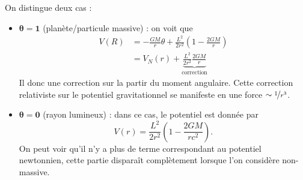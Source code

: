\documentclass[a4paper,11pt]{report}
\begin{document}
            On distingue deux cas :
            \begin{itemize}[label = \textbullet]
                \item $\bm{\theta = 1}$ (planète/particule massive) : on voit que 
                \begin{align}
                    V(R) &= -\frac{GM}{r}\theta+\frac{L^2}{2r^2}\left( 1-\frac{2GM}{r} \right)\\
                    &= V_N(r)+\underbrace{\frac{L^2}{2r^2}\frac{2GM}{r}}_{\text{correction}}
                \end{align}
                Il donc une correction sur la partir du moment angulaire. Cette correction relativiste sur le potentiel gravitationnel se manifeste en une force $\sim\nicefrac{1}{r^3}$. 
                \item $\bm{\theta = 0}$ (rayon lumineux) : dans ce cas, le potentiel est donnée par
                \begin{equation}
                    V(r) = \frac{L^2}{2r^2}\left( 1-\frac{2GM}{rc^2} \right).
                \end{equation}
                On peut voir qu'il n'y a plus de terme correspondant au potentiel newtonnien, cette partie disparaît complètement lorsque l'on considère non-massive.
            \end{itemize}
            
            
\end{document}
